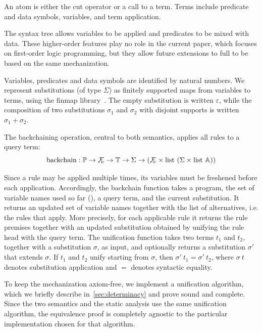 \documentclass[sigplan,10pt,anonymous,review]{acmart}
\renewcommand{\epsilon}{\varepsilon}
\begin{document}
An atom is either the cut operator or a call to a term.
Terms include predicate and data symbols, variables, and term application.

The syntax tree allows variables to be applied and predicates to be mixed with data.
These higher-order features play no role in the current paper, which focuses
on first-order logic programming, but they allow future extensions to full
\lprologP{} to be based on the same mechanization.


Variables, predicates and data symbols
are identified by natural numbers. We represent substitutions
(of type $\Sigma$) as finitely supported maps from variables to terms, using the
finmap library~\cite{finmap}.
The empty substitution is written $\epsilon$,
while the composition of two substitutions $\sigma_1$ and $\sigma_2$ with
disjoint supports is written $\sigma_1 + \sigma_2$. %
 
The backchaining operation,
central to both semantics,
applies all rules to a query term:
%
%
$$\mathrm{backchain} : \mathbb{P} \to \FV \to \TERM \to \Sigma \to (\FV \times \mathrm{list}\ (\Sigma \times \mathrm{list}\ \ATOM)) $$

Since a rule may be applied multiple times, its variables must be
freshened before each application. Accordingly, the backchain function
takes a program, the set of variable names used so far (\FV), a
query term, and the current substitution. It returns an updated
set of variable names together with the list of alternatives, i.e. the
rules that apply. More precisely, for each applicable rule it returns the
rule premises together with an updated substitution obtained by unifying
the rule head with the query term.
The unification function takes two terms $t_1$ and $t_2$, together with a
substitution $\sigma$, as input, and optionally returns a substitution
$\sigma'$ that extends $\sigma$. If $t_1$ and $t_2$ unify
starting from $\sigma$, then $\sigma'~t_1 = \sigma'~t_2$, where
$\sigma~t$ denotes substitution application and $=$ denotes 
syntactic equality.

To keep the mechanization axiom-free, we implement a unification
algorithm, which we briefly describe in~\cref{sec:determinacy} and prove
sound and complete.
Since the two semantics and the static analysis use the same
unification algorithm, the equivalence proof is completely agnostic to
the particular implementation chosen for that algorithm.

% 
\end{document}
